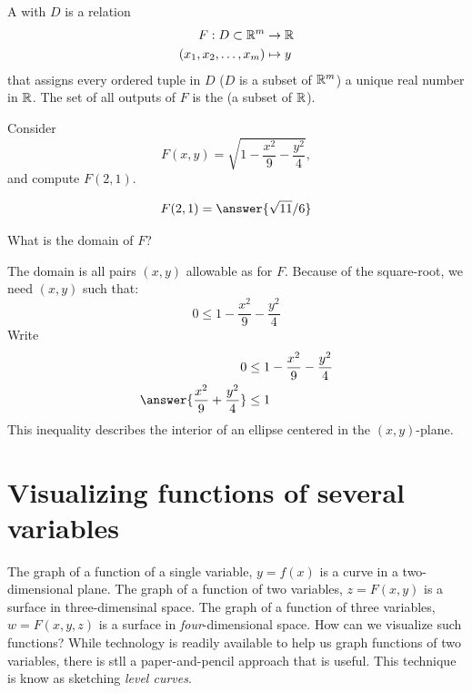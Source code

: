 \documentclass{ximera}
\begin{document}
\begin{definition}
  A  with  $D$ is a
  relation
  \begin{align*}
    F: D\subset \mathbb R^m  &\to \mathbb R\\
    (x_1,x_2,\dots,x_m) &\mapsto y
  \end{align*}
  that assigns every ordered tuple in $D$ ($D$ is a subset of $\mathbb R^m$)
  a unique real number in $\mathbb R$. The set of all outputs of $F$ is the
   (a subset of $\mathbb R$).
\end{definition}

\begin{question}
  Consider
  \[
  F(x,y) = \sqrt{1-\frac{x^2}9-\frac{y^2}4},
  \]
  and compute $F(2,1)$.
  \begin{prompt}
    \[
    F(2,1) = \answer{\sqrt{11}/6}
    \]
  \end{prompt}
  \begin{question}
    What is the domain of $F$?
    \begin{prompt}
      The domain is all pairs $(x,y)$ allowable as
       for $F$.
      Because of the square-root, we need $(x,y)$ such that:
      \[
      0 \le 1-\frac{x^2}{9}-\frac{y^2}{4}
      \]
      Write
      \begin{align*}
        0&\le 1-\frac{x^2}{9}-\frac{y^2}{4}\\
        \answer{\frac{x^2}{9}+\frac{y^2}{4}}&\le 1
      \end{align*}
      This inequality describes the interior of an ellipse centered in
      the $(x,y)$-plane.
    \end{prompt}
  \end{question}
\end{question}



\section{Visualizing functions of several variables}


The graph of a function of a single variable, $y=f(x)$ is a curve in a
two-dimensional plane. The graph of a function of two variables, $z =
F(x,y)$ is a surface in three-dimensinal space. The graph of a
function of three variables, $w=F(x,y,z)$ is a surface in
\textit{four}-dimensional space. How can we visualize such functions?
While technology is readily available to help us graph functions of two
variables, there is stll a paper-and-pencil approach that is useful.
This technique is know as sketching \textit{level curves}.
\end{document}
